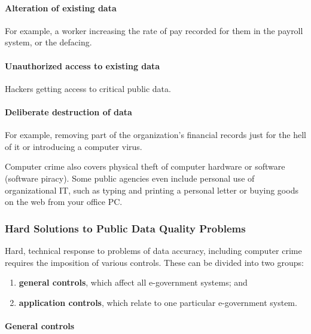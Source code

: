 \paragraph*{Alteration of existing data}
 For example, a worker increasing the rate of pay recorded for them in the payroll system, or the defacing.
 
 \paragraph*{Unauthorized access to existing data}
Hackers getting access to critical public data.

 \paragraph*{Deliberate destruction of data}
 For example, removing part of the organization's financial records just for the hell of it or introducing a computer virus.



\noindent Computer crime also covers physical theft of computer hardware or software (software piracy). Some public agencies even include personal use of organizational IT, such as typing and printing a personal letter or buying goods on the web from your office PC.


\subsubsection[Hard Solutions]{Hard Solutions to Public Data Quality Problems}
Hard, technical response to problems of data accuracy, including computer crime requires the imposition of various controls. These can be divided into two groups: 
\begin{enumerate}
	\item \textbf{general controls}, which affect all e-government systems; and 
	\item \textbf{application controls}, which relate to one particular e-government system.
	
\end{enumerate}


\paragraph*{General controls}

